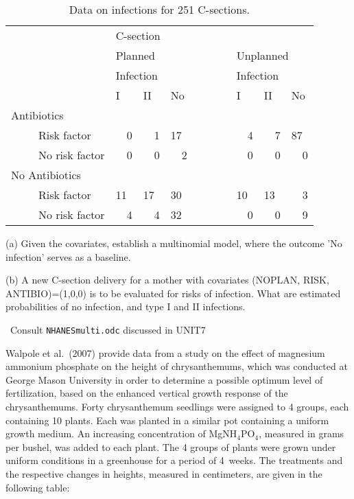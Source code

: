 \documentclass[12pt]{article}
\begin{document}
\begin{table}[h]
\centering
\caption{\small Data on infections for 251 C-sections.\label{tab:cs} }
\vspace*{0.1in}
\begin{tabular}{llllllll}
\hline
  & \multicolumn{3}{l}{C-section} &  & & & \\
  \cline{2-8}
    & \multicolumn{3}{l}{Planned} & & \multicolumn{3}{l}{Unplanned}  \\
   \cline{2-4}
   \cline{6-8}
   & \multicolumn{3}{l}{Infection} & & \multicolumn{3}{l}{Infection}  \\
   \cline{2-4}
   \cline{6-8}
   & I & II & No &   & I & II &  No \\
\hline
Antibiotics  & & &  & ~~~~~ & & &  \\
{~~~~~}Risk factor & ~~0 & ~~1 & 17 &  & ~~4 & ~~7 & 87 \\
{~~~~~}No risk factor & ~~0 & ~~0 & ~~2 &  & ~~0 & ~~0 & ~~0 \\
\hline
No Antibiotics  & & &  & ~~~~~ & & &  \\
{~~~~~}Risk factor & 11 & 17 & 30 &  & 10 & 13 & ~~3 \\
{~~~~~}No risk factor & ~~4 & ~~4 & 32 &  & ~~0 & ~~0 & ~~9 \\
\hline
\end{tabular}
\end{table}

(a) Given the covariates, establish a multinomial model, where the outcome 'No infection' serves as a baseline.


(b) A new C-section delivery for a mother
 with covariates (NOPLAN, RISK, ANTIBIO)=(1,0,0) is to be evaluated for risks of infection.
 What are estimated probabilities of no infection, and type I and II infections.

\vspace*{0.1in}
 ~Consult {\tt NHANESmulti.odc} discussed in UNIT7

\vspace*{0.3in}

%
Walpole et al.\ (2007)  provide data from a study
on the effect of magnesium ammonium phosphate on the height of chrysanthemums,
which was conducted at George Mason  University in order to determine a possible
optimum level of fertilization, based on the enhanced vertical growth
response of the chrysanthemums. Forty chrysanthemum seedlings were assigned
to 4 groups, each containing 10 plants. Each was planted in a similar pot
containing a uniform growth medium. An increasing
concentration of MgNH$_4$PO$_4$, measured in grams per  bushel, was added to each plant. The 4
groups of plants were grown under uniform conditions in a greenhouse for a
period of 4~weeks. The treatments and the respective changes in heights,
measured in centimeters, are given in the following table:
\end{document}
